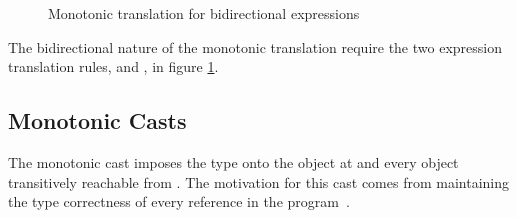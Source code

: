 \documentclass[a4paper,USenglish]{tex/lipics-v2016}
\begin{document}
\begin{figure}[!ht]
\begin{mathpar}

\end{mathpar}

\caption{Monotonic translation for bidirectional expressions}
\label{fig:mono-trans3}
\end{figure}

The bidirectional nature of the monotonic translation require the two 
expression translation rules,  and , 
in figure \ref{fig:mono-trans3}.

\subsection{Monotonic Casts}

The monotonic cast \MonCast\C\a imposes the type \C onto the object
at \a and every object transitively reachable from \a. The motivation 
for this cast comes from maintaining the
type correctness of every reference in the program~\cite{Siek2015}.
\end{document}
